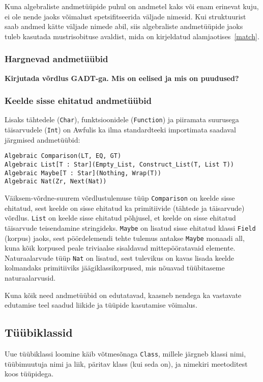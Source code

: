 \documentclass[12pt]{article}
\newcommand\markus[1]{\textcolor{roheline}{\textbf{#1}}}
\begin{document}
        Kuna algebraliste andmetüüpide puhul on andmetel kaks või enam erinevat kuju, ei ole nende jaoks võimalust spetsifitseerida väljade nimesid. Kui struktuurist saab andmed kätte väljade nimede abil, siis algebraliste andmetüüpide jaoks tuleb kasutada mustrisobituse avaldist, mida on kirjeldatud alamjaotises~\ref{match}.
      \subsubsection{Hargnevad andmetüübid}\label{hargnevad}
        \markus{Kirjutada võrdlus GADT-ga. Mis on eelised ja mis on puudused?}
      \subsubsection{Keelde sisse ehitatud andmetüübid}\label{sisseehitatudalgebralised}
        Lisaks tähtedele (\verb!Char!), funktsioonidele (\verb!Function!) ja piiramata suurusega täisarvudele (\verb!Int!) on Awfulis ka ilma standardteeki importimata saadaval järgmised andmetüübid:

        \begin{verbatim}Algebraic Comparison(LT, EQ, GT)
Algebraic List[T : Star](Empty_List, Construct_List(T, List T))
Algebraic Maybe[T : Star](Nothing, Wrap(T))
Algebraic Nat(Zr, Next(Nat))\end{verbatim}

        Väiksem-võrdne-suurem võrdlustulemuse tüüp \verb!Comparison! on keelde sisse ehitatud, sest keelde on sisse ehitatud ka primitiivide (tähtede ja täisarvude) võrdlus. \verb!List! on keelde sisse ehitatud põhjusel, et keelde on sisse ehitatud täisarvude teisendamine stringideks. \verb!Maybe! on lisatud sisse ehitatud klassi \verb!Field! (korpus) jaoks, sest pöördelemendi tehte tulemus antakse \verb!Maybe! monaadi all, kuna kõik korpused peale triviaalse sisaldavad mittepööratavaid elemente. Naturaalarvude tüüp \verb!Nat! on lisatud, sest tulevikus on kavas lisada keelde kolmandaks primitiiviks jäägiklassikorpused, mis nõuavad tüübitaseme naturaalarvusid.

        Kuna kõik need andmetüübid on edutatavad, kaasneb nendega ka vastavate edutamise teel saadud liikide ja tüüpide kasutamise võimalus.
    \subsection{Tüübiklassid}
      Uue tüübiklassi loomine käib võtmesõnaga \verb!Class!, millele järgneb klassi nimi, tüübimuutuja nimi ja liik, päritav klass (kui seda on), ja nimekiri meetoditest koos tüüpidega.
\end{document}
